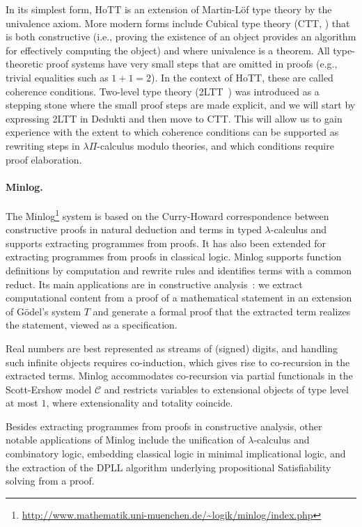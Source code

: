 In its simplest form, HoTT is an extension of Martin-L\"of type theory by the
univalence axiom. More modern forms include Cubical type theory (CTT,
\cite{cohen:cubical}) that is both constructive (i.e., proving the existence of
an object provides an algorithm for effectively computing the object) and where
univalence is a theorem. All type-theoretic proof systems have very small steps
that are omitted in proofs (e.g., trivial equalities such as $1+1=2$). In the
context of HoTT, these are called coherence conditions. Two-level type theory
(2LTT~\cite{annenkov:two-level}) was introduced as a stepping stone where the
small proof steps are made explicit, and we will start by expressing 2LTT in
Dedukti and then move to CTT. This will allow us to gain experience with
the extent to which coherence conditions can be supported as rewriting steps in
$\lambda\Pi$-calculus modulo theories, and which conditions require proof
elaboration.

\paragraph*{Minlog.}
The
Minlog\footnote{\url{http://www.mathematik.uni-muenchen.de/~logik/minlog/index.php}}
system is based on the Curry-Howard correspondence between constructive proofs
in natural deduction and terms in typed $\lambda$-calculus and supports
extracting programmes from proofs. It has also been extended for extracting
programmes from proofs in classical logic. Minlog supports function definitions by
computation and rewrite rules and identifies terms with a common reduct. Its
main applications are in constructive analysis~\cite{miyamoto:real}: we extract
computational content from a proof of a mathematical statement in an extension
of Gödel's system $T$ and generate a formal proof that the extracted term
realizes the statement, viewed as a specification.

Real numbers are best represented as streams of (signed) digits, and handling
such infinite objects requires co-induction, which gives rise to co-recursion in
the extracted terms. Minlog accommodates co-recursion via partial functionals in
the Scott-Ershow model $\mathcal{C}$ and restricts variables to extensional
objects of type level at most $1$, where extensionality and totality coincide.

Besides extracting programmes from proofs in constructive analysis, other notable
applications of Minlog include the unification of $\lambda$-calculus and
combinatory logic, embedding classical logic in minimal implicational logic, and
the extraction of the DPLL algorithm underlying propositional Satisfiability
solving from a proof.

